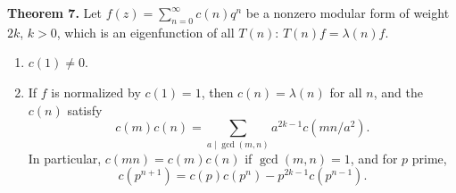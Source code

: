\textbf{Theorem 7.} Let $f(z) = \sum_{n=0}^{\infty} c(n) q^n$ be a nonzero modular form of weight $2k$, $k > 0$, which is an eigenfunction of all $T(n)$: $T(n)f = \lambda(n)f$.
\begin{enumerate}
\item[(a)] $c(1) \neq 0$.
\item[(b)] If $f$ is normalized by $c(1) = 1$, then $c(n) = \lambda(n)$ for all $n$, and the $c(n)$ satisfy
$$c(m)c(n) = \sum_{a \mid \gcd(m,n)} a^{2k-1} c(mn/a^2).$$
In particular, $c(mn) = c(m)c(n)$ if $\gcd(m,n) = 1$, and for $p$ prime,
$$c(p^{n+1}) = c(p)c(p^n) - p^{2k-1}c(p^{n-1}).$$
\end{enumerate}
